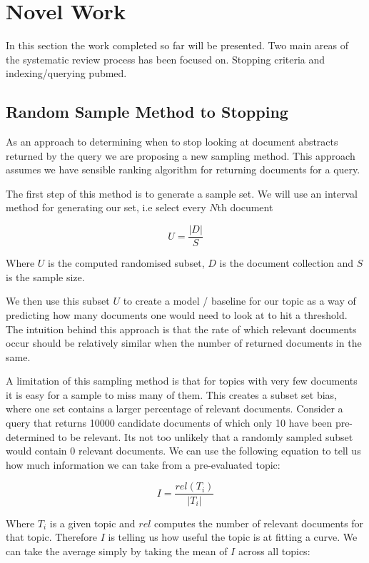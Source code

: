 \chapter{Novel Work}

In this section the work completed so far will be presented. Two main areas of the systematic review process has been focused on. Stopping criteria and indexing/querying pubmed.

\section{Random Sample Method to Stopping}

As an approach to determining when to stop looking at document abstracts returned by the query we are proposing a new sampling method. This approach assumes we have sensible ranking algorithm for returning documents for a query.

The first step of this method is to generate a sample set. We will use an interval method for generating our set, i.e select every $N$th document 

\begin{equation}
U = \frac{|D|}{S}
\end{equation}

Where $U$ is the computed randomised subset, $D$ is the document collection and $S$ is the sample size.

We then use this subset $U$ to create a model / baseline for our topic as a way of predicting how many documents one would need to look at to hit a threshold. The intuition behind this approach is that the rate of which relevant documents occur should be relatively similar when the number of returned documents in the same.

\iffalse
A limitation of this sampling method is that for topics with very few documents it is easy for a sample to miss many of them. This creates a subset set bias, where one set contains a larger percentage of relevant documents. Consider a query that returns 10000 candidate documents of which only 10 have been pre-determined to be relevant. Its not too unlikely that a randomly sampled subset would contain 0 relevant documents. We can use the following equation to tell us how much information we can take from a pre-evaluated topic:

\begin{equation}
I = \frac{rel(T_i)}{|T_i|}
\end{equation}

Where $T_i$ is a given topic and $rel$ computes the number of relevant documents for that topic. Therefore $I$ is telling us how useful the topic is at fitting a curve. We can take the average simply by taking the mean of $I$ across all topics:

